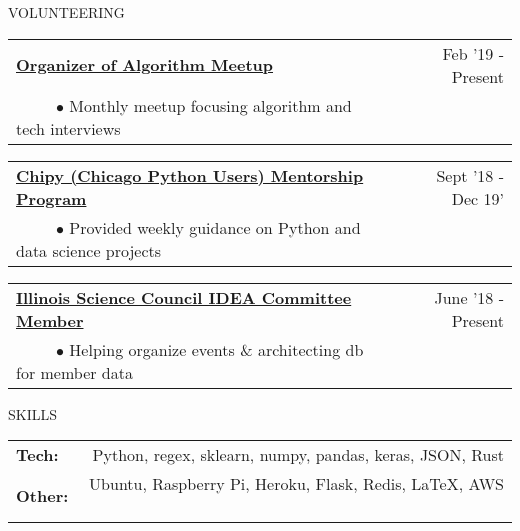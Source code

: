 \documentclass[11pt]{article}
\begin{document}
\vspace {0.8cm}

{VOLUNTEERING}
\vspace {0.4cm}

\begin{tabularx}{\linewidth}{l X r}
\textbf{\href{https://chicagopython.github.io/algosig/}{Organizer of Algorithm Meetup}} & & Feb '19 - Present \\
~~~~~$\bullet$ Monthly meetup focusing algorithm and tech interviews\\

\end{tabularx}

\begin{tabularx}{\linewidth}{l X r}
\textbf{\href{https://chipymentor.org/}{Chipy (Chicago Python Users) Mentorship Program}} & & Sept '18 - Dec 19' \\
~~~~~$\bullet$ Provided weekly guidance on Python and data science projects\\
\end{tabularx}


\begin{tabularx}{\linewidth}{l X r}
\textbf{\href{http://www.illinoisscience.org/about-2/associates-board/}{Illinois Science Council IDEA Committee Member}} & & June '18 - Present \\
~~~~~$\bullet$ Helping organize events \& architecting db for member data\\
\end{tabularx}


\vspace {.8cm}

{SKILLS}
\vspace{0.4cm}

\begin{tabularx}{\linewidth}{X r}
\textbf{Tech:} & Python, regex, sklearn, numpy, pandas, keras, JSON, Rust \\
\textbf{Other:} & Ubuntu, Raspberry Pi, Heroku, Flask, Redis,  \LaTeX, AWS \
\end{tabularx}
\end{document}

